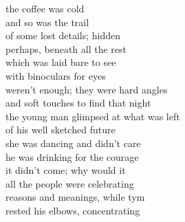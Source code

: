 the coffee was cold\\
and so was the trail\\
of some lost details; hidden\\
perhaps, beneath all the rest\\
which was laid bare to see\\

with binoculars for eyes\\
weren't enough; they were hard angles\\
and soft touches to find that night\\
the young man glimpsed at what was left\\
of his well sketched future\\

she was dancing and didn't care\\
he was drinking for the courage\\
it didn't come; why would it\\
all the people were celebrating\\
reasons and meanings, while tym\\
rested his elbows, concentrating\\
